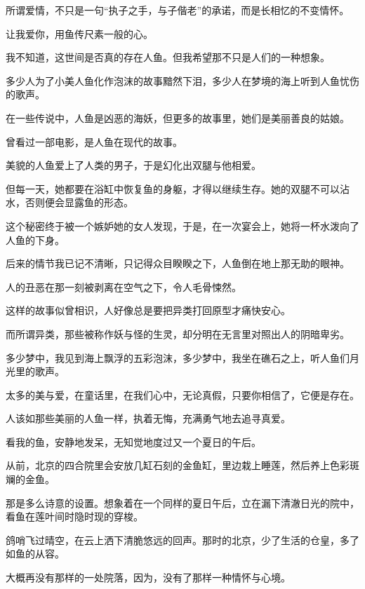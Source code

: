 		\vspace{1em}
		所谓爱情，不只是一句“执子之手，与子偕老”的承诺，而是长相忆的不变情怀。\par
		让我爱你，用鱼传尺素一般的心。

		\vspace{1em}
		我不知道，这世间是否真的存在人鱼。但我希望那不只是人们的一种想象。

		\vspace{1em}
		多少人为了小美人鱼化作泡沫的故事黯然下泪，多少人在梦境的海上听到人鱼忧伤的歌声。\par
		在一些传说中，人鱼是凶恶的海妖，但更多的故事里，她们是美丽善良的姑娘。

		\vspace{1em}
		曾看过一部电影，是人鱼在现代的故事。\par
		美貌的人鱼爱上了人类的男子，于是幻化出双腿与他相爱。\par
		但每一天，她都要在浴缸中恢复鱼的身躯，才得以继续生存。她的双腿不可以沾水，否则便会显露鱼的形态。\par
		这个秘密终于被一个嫉妒她的女人发现，于是，在一次宴会上，她将一杯水泼向了人鱼的下身。\par
		后来的情节我已记不清晰，只记得众目睽睽之下，人鱼倒在地上那无助的眼神。\par
		人的丑恶在那一刻被剥离在空气之下，令人毛骨悚然。

		\vspace{1em}
		这样的故事似曾相识，人好像总是要把异类打回原型才痛快安心。\par
		而所谓异类，那些被称作妖与怪的生灵，却分明在无言里对照出人的阴暗卑劣。\par
		多少梦中，我见到海上飘浮的五彩泡沫，多少梦中，我坐在礁石之上，听人鱼们月光里的歌声。

		\vspace{1em}
		太多的美与爱，在童话里，在我们心中，无论真假，只要你相信了，它便是存在。\par
		人该如那些美丽的人鱼一样，执着无悔，充满勇气地去追寻真爱。

		\vspace{1em}
		看我的鱼，安静地发呆，无知觉地度过又一个夏日的午后。\par
		从前，北京的四合院里会安放几缸石刻的金鱼缸，里边栽上睡莲，然后养上色彩斑斓的金鱼。\par
		那是多么诗意的设置。想象着在一个同样的夏日午后，立在漏下清澈日光的院中，看鱼在莲叶间时隐时现的穿梭。\par
		鸽哨飞过晴空，在云上洒下清脆悠远的回声。那时的北京，少了生活的仓皇，多了如鱼的从容。\par
		大概再没有那样的一处院落，因为，没有了那样一种情怀与心境。

